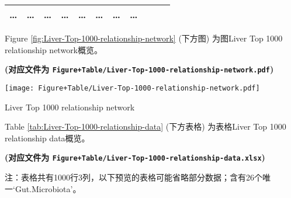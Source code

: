 \documentclass[
]{article}
\begin{document}
\begin{longtable}[]{@{}lllllllllll@{}}
\begin{minipage}[t]{0.09\columnwidth}
\ldots{}\strut
\end{minipage} & \begin{minipage}[t]{0.07\columnwidth}\raggedright
\ldots{}\strut
\end{minipage} & \begin{minipage}[t]{0.07\columnwidth}\raggedright
\ldots{}\strut
\end{minipage} & \begin{minipage}[t]{0.09\columnwidth}\raggedright
\ldots{}\strut
\end{minipage} & \begin{minipage}[t]{0.07\columnwidth}\raggedright
\ldots{}\strut
\end{minipage} & \begin{minipage}[t]{0.07\columnwidth}\raggedright
\ldots{}\strut
\end{minipage} & \begin{minipage}[t]{0.07\columnwidth}\raggedright
\ldots{}\strut
\end{minipage} & \begin{minipage}[t]{0.03\columnwidth}\raggedright
\ldots{}\strut
\end{minipage}\tabularnewline
\bottomrule
\end{longtable}

Figure \ref{fig:Liver-Top-1000-relationship-network} (下方图) 为图Liver Top 1000 relationship network概览。

\textbf{(对应文件为 \texttt{Figure+Table/Liver-Top-1000-relationship-network.pdf})}

\def\@captype{figure}
\begin{center}
\texttt{[image: Figure+Table/Liver-Top-1000-relationship-network.pdf]}
\caption{Liver Top 1000 relationship network}\label{fig:Liver-Top-1000-relationship-network}
\end{center}

Table \ref{tab:Liver-Top-1000-relationship-data} (下方表格) 为表格Liver Top 1000 relationship data概览。

\textbf{(对应文件为 \texttt{Figure+Table/Liver-Top-1000-relationship-data.xlsx})}

\begin{center}\begin{tcolorbox}[colback=gray!10, colframe=gray!50, width=0.9\linewidth, arc=1mm, boxrule=0.5pt]注：表格共有1000行3列，以下预览的表格可能省略部分数据；含有26个唯一`Gut.Microbiota'。
\end{tcolorbox}
\end{center}
\end{document}
